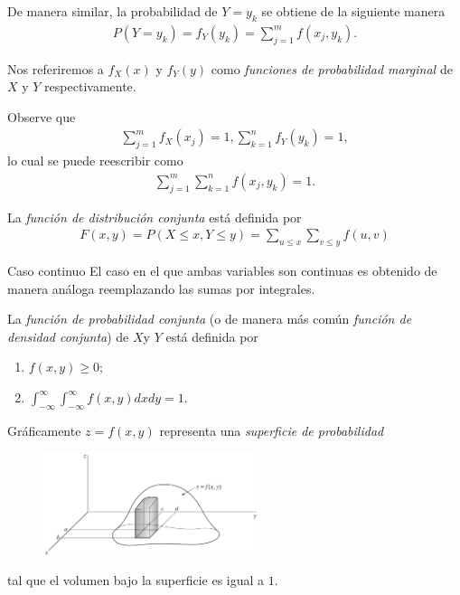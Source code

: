 	De manera similar, la probabilidad de $Y=y_{k}$ se obtiene de la siguiente manera
	\begin{align}
	\label{2.16}
		P(Y=y_{k})=f_{Y}(y_{k})=\sum_{j=1}^{m}f(x_{j},y_{k}).
	\end{align}


 
 	Nos referiremos a $f_{X}(x)$ y $f_{Y}(y)$ como \emph{funciones de probabilidad marginal} de $X$ y $Y$ respectivamente.
 

	Observe que
	\begin{align}
	\label{2.17}
		\sum_{j=1}^{m}f_{X}(x_{j})=1,
		\sum_{k=1}^{n}f_{Y}(y_{k})=1,
	\end{align}
	lo cual se puede reescribir como
	\begin{align}
		\label{2.18}
		\sum_{j=1}^{m}\sum_{k=1}^{n}f(x_{j},y_{k})=1.
	\end{align}



	La \emph{función de distribución conjunta } está definida por
	\begin{align}
	\label{2.19}
		F(x,y)=P(X\leq x, Y\leq y)
		=\sum_{u\leq x}\sum_{v\leq y}f(u,v)
	\end{align}



{Caso continuo}
	El caso en el que ambas variables son continuas es obtenido de manera análoga reemplazando las sumas por integrales.


	La \emph{función de probabilidad conjunta} (o de manera más común \emph{función de densidad conjunta}) de $X$y $Y$ está definida por
	\begin{enumerate}
		\item $f(x,y)\geq 0;$
		\item $\displaystyle \int_{-\infty}^{\infty}\int_{-\infty}^{\infty}
		f(x,y) dxdy=1.$
	\end{enumerate}



	Gráficamente $z=f(x,y)$ representa una \emph{superficie de probabilidad}
\begin{figure}[h]
	\centering
	\includegraphics[height=3cm,keepaspectratio=true]{./pe/pands0204.png}
	\label{fig:2.4}
\end{figure}
tal que el volumen bajo la superficie es igual a $1.$


